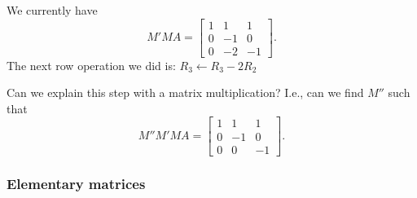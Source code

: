 \begin{frame}
We currently have
\[
M'MA =
\begin{bmatrix}
  1 & 1 & 1 \\
  0 & -1 & 0 \\
  0 & -2 & -1
\end{bmatrix}.
\]
The next row operation we did is: $R_3\leftarrow R_3-2R_2$

Can we explain this step with a matrix multiplication? \pause I.e., can we find $M''$ such that
\[
M''M'MA = 
\begin{bmatrix}
  1 & 1 & 1 \\
  0 & -1 & 0 \\
  0 & 0 & -1
\end{bmatrix}.
\]
\end{frame}

\begin{frame}
  \frametitle{Elementary matrices}
  
  {\footnotesize
               
}
\end{frame}
